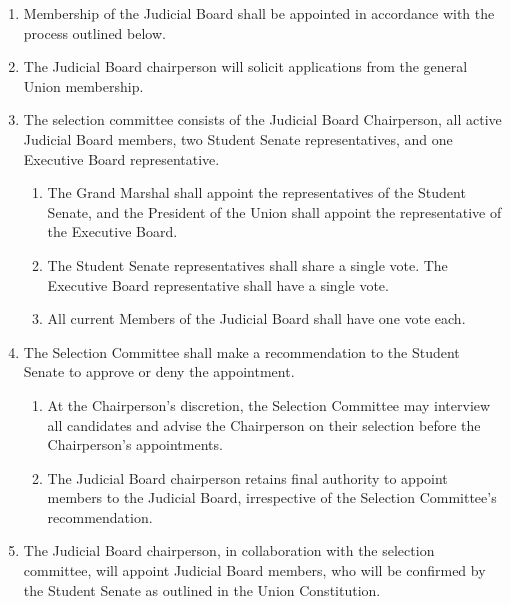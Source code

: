 
\begin{enumerate}
    \item Membership of the Judicial Board shall be appointed in accordance with the process outlined below.
    \item The Judicial Board chairperson will solicit applications from the general Union membership.
    \item The selection committee consists of the Judicial Board Chairperson, all active Judicial Board members, two Student Senate representatives, and one Executive Board representative.
    \begin{enumerate}
        \item The Grand Marshal shall appoint the representatives of the Student Senate, and the President of the Union shall appoint the representative of the Executive Board.
        \item The Student Senate representatives shall share a single vote. The Executive Board representative shall have a single vote.
        \item All current Members of the Judicial Board shall have one vote each.
    \end{enumerate}
    \item The Selection Committee shall make a recommendation to the Student Senate to approve or deny the appointment.
    \begin{enumerate}
        \item At the Chairperson's discretion, the Selection Committee may interview all candidates and advise the Chairperson on their selection before the Chairperson's appointments.
        \item The Judicial Board chairperson retains final authority to appoint members to the Judicial Board, irrespective of the Selection Committee's recommendation.
    \end{enumerate}
    \item The Judicial Board chairperson, in collaboration with the selection committee, will appoint Judicial Board members, who will be confirmed by the Student Senate as outlined in the Union Constitution.
\end{enumerate}


